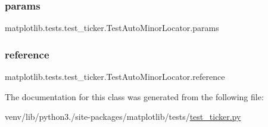 \subsubsection{\texorpdfstring{params}{params}}
{\footnotesize\ttfamily matplotlib.\+tests.\+test\+\_\+ticker.\+Test\+Auto\+Minor\+Locator.\+params\hspace{0.3cm}{\ttfamily [static]}}

\mbox{\label{classmatplotlib_1_1tests_1_1test__ticker_1_1TestAutoMinorLocator_a8f3b224c1f3aa62113d481876df2345b}} 
\subsubsection{\texorpdfstring{reference}{reference}}
{\footnotesize\ttfamily matplotlib.\+tests.\+test\+\_\+ticker.\+Test\+Auto\+Minor\+Locator.\+reference\hspace{0.3cm}{\ttfamily [static]}}



The documentation for this class was generated from the following file\+:\begin{DoxyCompactItemize}
\item 
venv/lib/python3./site-\/packages/matplotlib/tests/\hyperlink{test__ticker_8py}{test\+\_\+ticker.\+py}\end{DoxyCompactItemize}

